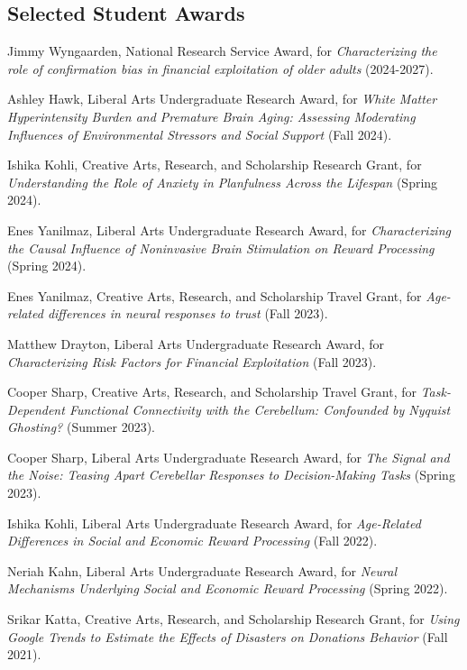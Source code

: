 \documentclass[11pt, letterpaper]{article}
\begin{document}
\subsection*{Selected Student Awards}

\begin{hangparas}{.5in}{1}

Jimmy Wyngaarden, National Research Service Award, for \textit{Characterizing the role of confirmation bias in financial exploitation of older adults} (2024-2027).

Ashley Hawk, Liberal Arts Undergraduate Research Award, for \textit{White Matter Hyperintensity Burden and Premature Brain Aging: Assessing Moderating Influences of Environmental Stressors and Social Support} (Fall 2024).

Ishika Kohli, Creative Arts, Research, and Scholarship Research Grant, for \textit{Understanding the Role of Anxiety in Planfulness Across the Lifespan} (Spring 2024).

Enes Yanilmaz, Liberal Arts Undergraduate Research Award, for \textit{Characterizing the Causal Influence of Noninvasive Brain Stimulation on Reward Processing} (Spring 2024).

Enes Yanilmaz, Creative Arts, Research, and Scholarship Travel Grant, for \textit{Age-related differences in neural responses to trust} (Fall 2023).

Matthew Drayton, Liberal Arts Undergraduate Research Award, for \textit{Characterizing Risk Factors for Financial Exploitation} (Fall 2023).

Cooper Sharp, Creative Arts, Research, and Scholarship Travel Grant, for \textit{Task-Dependent Functional Connectivity with the Cerebellum: Confounded by Nyquist Ghosting?} (Summer 2023).

Cooper Sharp, Liberal Arts Undergraduate Research Award, for \textit{The Signal and the Noise: Teasing Apart Cerebellar Responses to Decision-Making Tasks} (Spring 2023).

Ishika Kohli, Liberal Arts Undergraduate Research Award, for \textit{Age-Related Differences in Social and Economic Reward Processing} (Fall 2022).

Neriah Kahn, Liberal Arts Undergraduate Research Award, for \textit{Neural Mechanisms Underlying Social and Economic Reward Processing} (Spring 2022).

Srikar Katta, Creative Arts, Research, and Scholarship Research Grant, for \textit{Using Google Trends to Estimate the Effects of Disasters on Donations Behavior} (Fall 2021).


\end{hangparas}
\end{document}
